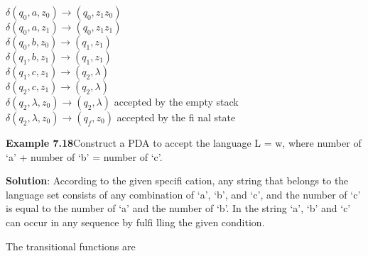 \documentclass{article}
\begin{document}
\begin{flushleft}
\hspace{2cm}$\delta$$(q_0,a,z_0)\xrightarrow{}(q_0,z_1z_0)$\\	
\hspace{2cm}$\delta$$(q_0,a,z_1)\xrightarrow{}(q_0,z_1z_1)$\\
\hspace{2cm}$\delta$$(q_0,b,z_0)\xrightarrow{}(q_1,z_1)$\\
\hspace{2cm}$\delta$$(q_1,b,z_1)\xrightarrow{}(q_1,z_1)$\\	
\hspace{2cm}$\delta$$(q_1,c,z_1)\xrightarrow{}(q_2,\lambda)$\\
\hspace{2cm}$\delta$$(q_2,c,z_1)\xrightarrow{}(q_2,\lambda)$\\
\hspace{2cm}$\delta$$(q_2,\lambda,z_0)\xrightarrow{}(q_2,\lambda)$ accepted by the empty stack\\
\hspace{2cm}$\delta$$(q_2,\lambda,z_0)\xrightarrow{}(q_f,z_0)$ accepted by the fi nal state\\
\end{flushleft}
\begin{flushleft}
	\textbf{Example 7.18}\hspace{5mm}Construct a PDA to accept the language L = {w, where number of ‘a’ + number of ‘b’ = number of ‘c’}.
\end{flushleft}
\begin{flushleft}
		\textbf{Solution}: According to the given specifi cation, any string that belongs to the language set consists of
		any combination of ‘a’, ‘b’, and ‘c’, and the number of ‘c’ is equal to the number of ‘a’ and the number
		of ‘b’. In the string ‘a’, ‘b’ and ‘c’ can occur in any sequence by fulfi lling the given condition.
		
		
		The transitional functions are
	\end{flushleft}
\end{document}
